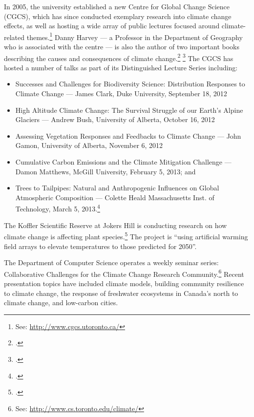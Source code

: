 \documentclass[10pt]{article}
\begin{document}
In 2005, the university established a new Centre for Global Change Science (CGCS), which has since conducted exemplary research into climate change effects, as well as hosting a wide array of public lectures focused around climate-related themes.\footnote{See: \url{http://www.cgcs.utoronto.ca/}}
Danny Harvey --- a Professor in the Department of Geography who is associated with the centre --- is also the author of two important books describing the causes and consequences of climate change.\footcite[][]{Harvey1999a} \footcite[][]{Harvey1999b}
The CGCS has hosted a number of talks as part of its Distinguished Lecture Series including:
\begin{itemize}
	\item Successes and Challenges for Biodiversity Science: Distribution Responses to Climate Change --- James Clark, Duke University, September 18, 2012
	\item High Altitude Climate Change: The Survival Struggle of our Earth’s Alpine Glaciers --- Andrew Bush, University of Alberta, October 16, 2012 
	\item Assessing Vegetation Responses and Feedbacks to Climate Change --- John Gamon, University of Alberta, November 6, 2012
	\item Cumulative Carbon Emissions and the Climate Mitigation Challenge --- Damon Matthews, McGill University, February 5, 2013; and
	\item Trees to Tailpipes: Natural and Anthropogenic Influences on Global Atmospheric Composition --- Colette Heald Massachusetts Inst. of Technology, March 5, 2013.\footcite[][]{DistinguishedLecturer}
\end{itemize}


The Koffler Scientific Reserve at Jokers Hill is conducting research on how climate change is affecting plant species.\footcite[][]{KofflerCC}
The project is ``using artificial warming field arrays to elevate temperatures to those predicted for 2050''.



The Department of Computer Science operates a weekly seminar series: Collaborative Challenges for the Climate Change Research Community.\footnote{See: \url{http://www.cs.toronto.edu/climate/}}
Recent presentation topics have included climate models, building community resilience to climate change, the response of freshwater ecosystems in Canada's north to climate change, and low-carbon cities.
\end{document}
